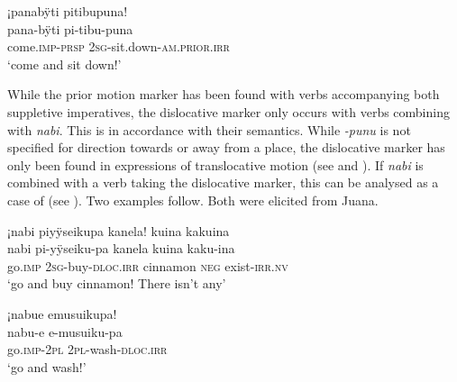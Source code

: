 \ea\label{ex:pana-4}
\begingl
\glpreamble ¡panabÿti pitibupuna!\\
\gla pana-bÿti pi-tibu-puna\\
\glb come.\textsc{imp}-\textsc{prsp} 2\textsc{sg}-sit.down-\textsc{am.prior.irr}\\
\glft ‘come and sit down!’
\endgl
\trailingcitation{[nxx-p630101g-2.07]}
\xe

While the prior motion marker has been found with verbs accompanying both suppletive imperatives, the dislocative marker only occurs with verbs combining with \textit{nabi}. This is in accordance with their semantics. While \textit{-punu} is not specified for direction towards or away from a place, the dislocative marker has only been found in expressions of translocative motion (see  and ). If \textit{nabi} is combined with a verb taking the dislocative marker, this can be analysed as a case of  (see ). Two examples follow. Both were elicited from Juana.


\ea\label{ex:nabi-9}
\begingl
\glpreamble ¡nabi piyÿseikupa kanela! kuina kakuina\\
\gla nabi pi-yÿseiku-pa kanela kuina kaku-ina\\
\glb go.\textsc{imp} 2\textsc{sg}-buy-\textsc{dloc.irr} cinnamon \textsc{neg} exist-\textsc{irr.nv}\\
\glft ‘go and buy cinnamon! There isn’t any’
\endgl
\trailingcitation{[jxx-e190210s-01]}
\xe

\ea\label{ex:nabi-11}
\begingl
\glpreamble ¡nabue emusuikupa!\\
\gla nabu-e e-musuiku-pa\\
\glb go.\textsc{imp}-2\textsc{pl} 2\textsc{pl}-wash-\textsc{dloc.irr}\\
\glft ‘go and wash!’
\endgl
\trailingcitation{[jxx-e190210s-01]}
\xe
{}


